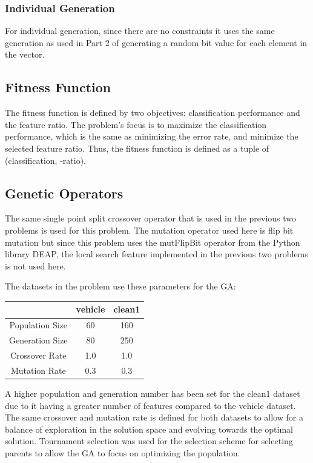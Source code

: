 \documentclass{article}
\begin{document}
\subsubsection*{Individual Generation}
For individual generation, since there are no constraints it uses the same generation as used in Part 2 of generating a random bit value for each element in the vector. 
\subsection*{Fitness Function}
The fitness function is defined by two objectives: classification performance and the feature ratio. The problem’s focus is to maximize the classification performance, which is the same as minimizing the error rate, and minimize the selected feature ratio. Thus, the fitness function is defined as a tuple of (classification, -ratio). 
\subsection*{Genetic Operators}
The same single point split crossover operator that is used in the previous two problems is used for this problem. The mutation operator used here is flip bit mutation but since this problem uses the mutFlipBit operator from the Python library DEAP, the local search feature implemented in the previous two problems is not used here.  \par
\noindent The datasets in the problem use these parameters for the GA: 
\begin{center}
\begin{tabular}{|c|c|c|}
\hline
& vehicle & clean1 \\
\hline
Population Size & 60 & 160 \\
\hline
Generation Size & 80 & 250 \\
\hline
Crossover Rate & 1.0 & 1.0 \\
\hline
Mutation Rate & 0.3 & 0.3 \\
\hline
\end{tabular}
\end{center}
A higher population and generation number has been set for the clean1 dataset due to it having a greater number of features compared to the vehicle dataset. The same crossover and mutation rate is defined for both datasets to allow for a balance of exploration in the solution space and evolving towards the optimal solution. Tournament selection was used for the selection scheme for selecting parents to allow the GA to focus on optimizing the population. 
\end{document}
